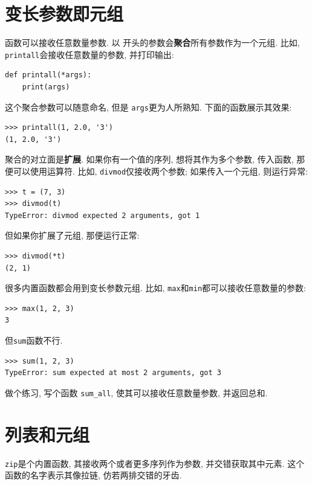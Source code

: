 \documentclass[10pt]{book}
\begin{document}
\section{变长参数即元组}
\label{gather}
函数可以接收任意数量参数. 以{\tt *} 开头的参数会{\bf 聚合}所有参数作为一个元组. 
比如, {\tt printall}会接收任意数量的参数, 并打印输出:

\begin{verbatim}
def printall(*args):
    print(args)
\end{verbatim}
%
这个聚合参数可以随意命名, 但是 {\tt args}更为人所熟知. 
下面的函数展示其效果:

\begin{verbatim}
>>> printall(1, 2.0, '3')
(1, 2.0, '3')
\end{verbatim}
%
聚合的对立面是{\bf 扩展}. 
如果你有一个值的序列, 想将其作为多个参数, 传入函数, 那便可以使用{\tt *}运算符. 
比如, {\tt divmod}仅接收两个参数; 如果传入一个元组, 则运行异常:

\begin{verbatim}
>>> t = (7, 3)
>>> divmod(t)
TypeError: divmod expected 2 arguments, got 1
\end{verbatim}
%
但如果你扩展了元组, 那便运行正常:

\begin{verbatim}
>>> divmod(*t)
(2, 1)
\end{verbatim}
%
很多内置函数都会用到变长参数元组. 
比如, {\tt max}和{\tt min}都可以接收任意数量的参数:

\begin{verbatim}
>>> max(1, 2, 3)
3
\end{verbatim}
%
但{\tt sum}函数不行.

\begin{verbatim}
>>> sum(1, 2, 3)
TypeError: sum expected at most 2 arguments, got 3
\end{verbatim}
%
做个练习, 写个函数 \verb"sum_all", 使其可以接收任意数量参数, 并返回总和. 


\section{列表和元组}
{\tt zip}是个内置函数,  其接收两个或者更多序列作为参数, 并交错获取其中元素. 
这个函数的名字表示其像拉链, 仿若两排交错的牙齿. 
\end{document}
